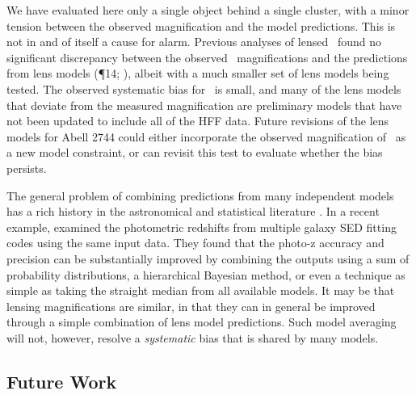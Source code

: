 We have evaluated here only a single object behind a single cluster,
with a minor tension between the observed magnification and the model
predictions.  This is not in and of itself a cause for alarm.
Previous analyses of lensed \SNIa\ found no significant discrepancy
between the observed \SNIa\ magnifications and the predictions from
lens models (\P14; \citealt{Nordin:2014}), albeit
with a much smaller set of lens models being tested.  The observed
systematic bias for \tomas\ is small, and many of the lens models that
deviate from the measured magnification are preliminary models that
have not been updated to include all of the HFF data.  Future
revisions of the lens models for Abell 2744 could either incorporate
the observed magnification of \tomas\ as a new model constraint, or
can revisit this test to evaluate whether the bias persists.

The general problem of combining predictions from many independent
models has a rich history in the astronomical and statistical
literature \citep[e.g.,][]{Press:1997,Hoeting:1999,Liddle:2009}.
In a recent example, \citet{Dahlen:2013} examined the photometric
redshifts from multiple galaxy SED fitting codes using the same input
data.  They found that the photo-z accuracy and precision can be
substantially improved by combining the outputs using a sum of
probability distributions, a hierarchical Bayesian method, or even a
technique as simple as taking the straight median from all available
models.  It may be that lensing magnifications are similar, in that
they can in general be improved through a simple combination of lens
model predictions.  Such model averaging will not, however, resolve a
{\it systematic} bias that is shared by many models.

\subsection{Future Work}

